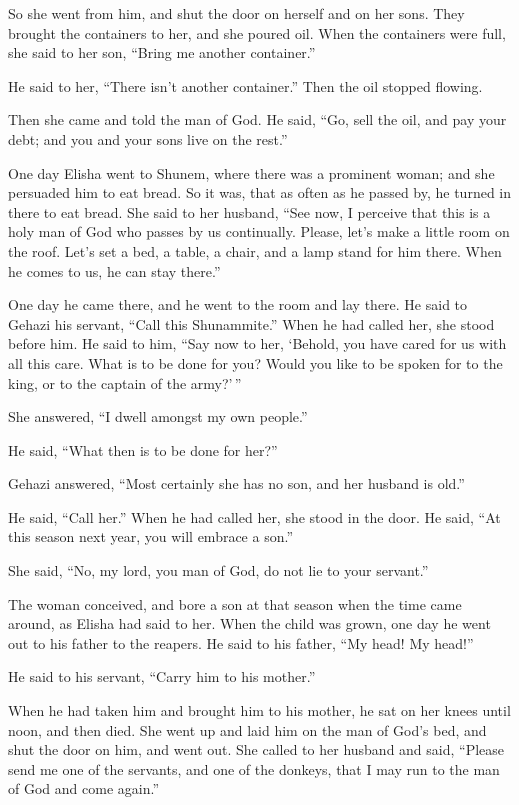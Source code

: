  So she went from him, and shut the door on herself and on
her sons. They brought the containers to her, and she poured oil.
 When the containers were full, she said to her son,
``Bring me another container.''

He said to her, ``There isn't another container.'' Then the oil stopped
flowing.

 Then she came and told the man of God. He said, ``Go,
sell the oil, and pay your debt; and you and your sons live on the
rest.''

 One day Elisha went to Shunem, where there was a
prominent woman; and she persuaded him to eat bread. So it was, that as
often as he passed by, he turned in there to eat bread. 
She said to her husband, ``See now, I perceive that this is a holy man
of God who passes by us continually.  Please, let's make
a little room on the roof. Let's set a bed, a table, a chair, and a lamp
stand for him there. When he comes to us, he can stay there.''

 One day he came there, and he went to the room and lay
there.  He said to Gehazi his servant, ``Call this
Shunammite.'' When he had called her, she stood before him.
 He said to him, ``Say now to her, `Behold, you have
cared for us with all this care. What is to be done for you? Would you
like to be spoken for to the king, or to the captain of the army?'\,''

She answered, ``I dwell amongst my own people.''

 He said, ``What then is to be done for her?''

Gehazi answered, ``Most certainly she has no son, and her husband is
old.''

 He said, ``Call her.'' When he had called her, she stood
in the door.  He said, ``At this season next year, you
will embrace a son.''

She said, ``No, my lord, you man of God, do not lie to your servant.''

 The woman conceived, and bore a son at that season when
the time came around, as Elisha had said to her.  When
the child was grown, one day he went out to his father to the reapers.
 He said to his father, ``My head! My head!''

He said to his servant, ``Carry him to his mother.''

 When he had taken him and brought him to his mother, he
sat on her knees until noon, and then died.  She went up
and laid him on the man of God's bed, and shut the door on him, and went
out.  She called to her husband and said, ``Please send
me one of the servants, and one of the donkeys, that I may run to the
man of God and come again.''

